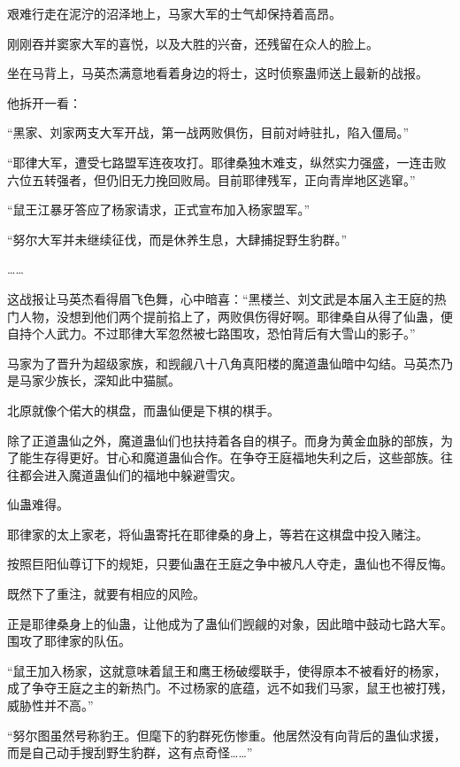 
\begin{this_body}



艰难行走在泥泞的沼泽地上，马家大军的士气却保持着高昂。

刚刚吞并窦家大军的喜悦，以及大胜的兴奋，还残留在众人的脸上。

坐在马背上，马英杰满意地看着身边的将士，这时侦察蛊师送上最新的战报。

他拆开一看：

“黑家、刘家两支大军开战，第一战两败俱伤，目前对峙驻扎，陷入僵局。”

“耶律大军，遭受七路盟军连夜攻打。耶律桑独木难支，纵然实力强盛，一连击败六位五转强者，但仍旧无力挽回败局。目前耶律残军，正向青岸地区逃窜。”

“鼠王江暴牙答应了杨家请求，正式宣布加入杨家盟军。”

“努尔大军并未继续征伐，而是休养生息，大肆捕捉野生豹群。”

……

这战报让马英杰看得眉飞色舞，心中暗喜：“黑楼兰、刘文武是本届入主王庭的热门人物，没想到他们两个提前掐上了，两败俱伤得好啊。耶律桑自从得了仙蛊，便自持个人武力。不过耶律大军忽然被七路围攻，恐怕背后有大雪山的影子。”

马家为了晋升为超级家族，和觊觎八十八角真阳楼的魔道蛊仙暗中勾结。马英杰乃是马家少族长，深知此中猫腻。

北原就像个偌大的棋盘，而蛊仙便是下棋的棋手。

除了正道蛊仙之外，魔道蛊仙们也扶持着各自的棋子。而身为黄金血脉的部族，为了能生存得更好。甘心和魔道蛊仙合作。在争夺王庭福地失利之后，这些部族。往往都会进入魔道蛊仙们的福地中躲避雪灾。

仙蛊难得。

耶律家的太上家老，将仙蛊寄托在耶律桑的身上，等若在这棋盘中投入赌注。

按照巨阳仙尊订下的规矩，只要仙蛊在王庭之争中被凡人夺走，蛊仙也不得反悔。

既然下了重注，就要有相应的风险。

正是耶律桑身上的仙蛊，让他成为了蛊仙们觊觎的对象，因此暗中鼓动七路大军。围攻了耶律家的队伍。

“鼠王加入杨家，这就意味着鼠王和鹰王杨破缨联手，使得原本不被看好的杨家，成了争夺王庭之主的新热门。不过杨家的底蕴，远不如我们马家，鼠王也被打残，威胁性并不高。”

“努尔图虽然号称豹王。但麾下的豹群死伤惨重。他居然没有向背后的蛊仙求援，而是自己动手搜刮野生豹群，这有点奇怪……”


\end{this_body}
